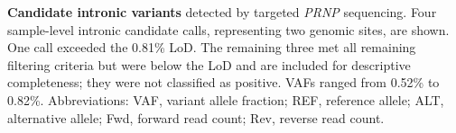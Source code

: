 \begin{table}[p]
\begin{minipage}[t][\textheight][c]{\linewidth}
		\vspace{0.5em}
		
		\begin{adjustbox}{max width=\textwidth}
			\begin{minipage}{\linewidth}
				\caption{\textbf{Candidate intronic variants} detected by targeted \textit{PRNP} sequencing. Four sample-level intronic candidate calls, representing two genomic sites, are shown. One call exceeded the 0.81\% LoD. The remaining three met all remaining filtering criteria but were below the LoD and are included for descriptive completeness; they were not classified as positive. VAFs ranged from 0.52\% to 0.82\%. Abbreviations: VAF, variant allele fraction; REF, reference allele; ALT, alternative allele; Fwd, forward read count; Rev, reverse read count.}
				\label{tab:prnp_somatic_snv_summary}
			\end{minipage}
\end{adjustbox}
		
		\end{minipage}
	\end{table}

\clearpage
